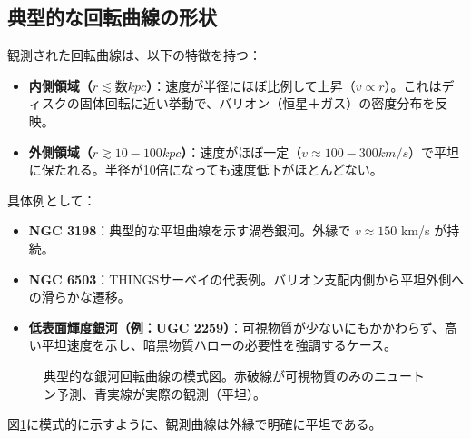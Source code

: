 \documentclass[dvipdfmx,a4paper]{jsbook}
\theoremstyle{definition}
\theoremstyle{remark}
\begin{document}
\subsection{典型的な回転曲線の形状}

観測された回転曲線は、以下の特徴を持つ：
\begin{itemize}
  \item \textbf{内側領域（$r \lesssim 数kpc$）}：速度が半径にほぼ比例して上昇（$v \propto r$）。これはディスクの固体回転に近い挙動で、バリオン（恒星＋ガス）の密度分布を反映。
  \item \textbf{外側領域（$r \gtrsim 10-100 kpc$）}：速度がほぼ一定（$v \approx 100-300 km/s$）で平坦に保たれる。半径が10倍になっても速度低下がほとんどない。
\end{itemize}

具体例として：
\begin{itemize}
  \item \textbf{NGC 3198}：典型的な平坦曲線を示す渦巻銀河。外縁で $v \approx 150$ km/s が持続。
  \item \textbf{NGC 6503}：THINGSサーベイの代表例。バリオン支配内側から平坦外側への滑らかな遷移。
  \item \textbf{低表面輝度銀河（例：UGC 2259）}：可視物質が少ないにもかかわらず、高い平坦速度を示し、暗黒物質ハローの必要性を強調するケース。
\end{itemize}

\begin{figure}[htbp]
\centering
{}
\caption{典型的な銀河回転曲線の模式図。赤破線が可視物質のみのニュートン予測、青実線が実際の観測（平坦）。}
\label{fig:rotation-curve}
\end{figure}

図\ref{fig:rotation-curve}に模式的に示すように、観測曲線は外縁で明確に平坦である。
\end{document}
